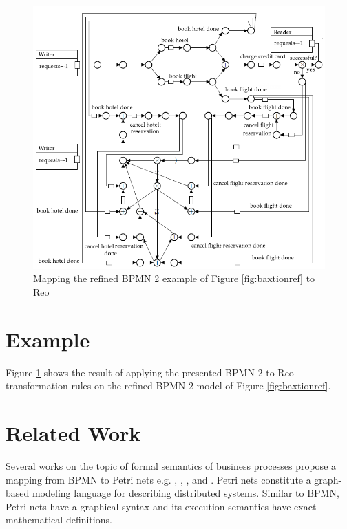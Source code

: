 \begin{figure}[!th]
\centering 
\includegraphics[width=1\textwidth]{img/exampleb2r.png} 
\caption{Mapping the refined BPMN 2 example of Figure \ref{fig:baxtionref} to Reo} 
\label{fig:finalreoex} 
\end{figure}

\section{Example}
\label{exmap}
Figure \ref{fig:finalreoex} shows the result of applying the presented BPMN 2 to Reo transformation rules on the refined  BPMN 2 model of Figure \ref{fig:baxtionref}.

\vspace*{.2cm}
\section{Related Work}
\label{chapterconv:relwrk}
Several works on the topic of formal semantics of business processes propose a mapping from BPMN to Petri nets \cite{journalsjcscAalst98} e.g. \cite{Tantitharanukul2010DetectingDA}, \cite{whyformalbpmn}, \cite{Decker11}, and \cite{doi:10.1177/1687814018808170}.
 Petri nets constitute a graph-based modeling language for describing distributed systems. Similar to BPMN, Petri nets have a graphical syntax and its execution
semantics have exact mathematical definitions. 

